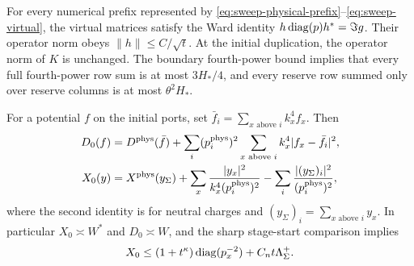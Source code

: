 \begin{lemma}\label{lem:duplication}
For every numerical prefix represented by
\eqref{eq:sweep-physical-prefix}--\eqref{eq:sweep-virtual}, the virtual
matrices satisfy the Ward identity
$h\operatorname{diag}(p)h^*=\Im g$. Their operator norm obeys
$\|h\|\le C/\sqrt t$. At the initial duplication, the operator norm
of $K$ is unchanged. The boundary fourth-power bound implies that
every full fourth-power row sum is at most $3H_*/4$, and every reserve
row summed only over reserve columns is at most $\theta^2H_*$.

For a potential $f$ on the initial ports, set
$\bar f_i=\sum_{x\text{ above }i}k_x^4 f_x$. Then
\begin{align}
 D_0(f)
 &=D^{\rm phys}(\bar f)
   +\sum_i(p_i^{\rm phys})^2
       \sum_{x\text{ above }i}k_x^4|f_x-\bar f_i|^2,
       \label{eq:sweep-duplicate-energy}\\
 X_0(y)
 &=X^{\rm phys}(y_\Sigma)
   +\sum_x\frac{|y_x|^2}{k_x^4(p_i^{\rm phys})^2}
   -\sum_i\frac{|(y_\Sigma)_i|^2}{(p_i^{\rm phys})^2},
       \label{eq:sweep-duplicate-dual}
\end{align}
where the second identity is for neutral charges and
$(y_\Sigma)_i=\sum_{x\text{ above }i}y_x$.
In particular $X_0\asymp W^*$ and $D_0\asymp W$, and the sharp
stage-start comparison implies
\begin{equation}\label{eq:sweep-sharp-duplicate}
 X_0\le (1+t^\kappa)\operatorname{diag}(p_x^{-2})+C_n t\Lambda^+_\Sigma.
\end{equation}
\end{lemma}

